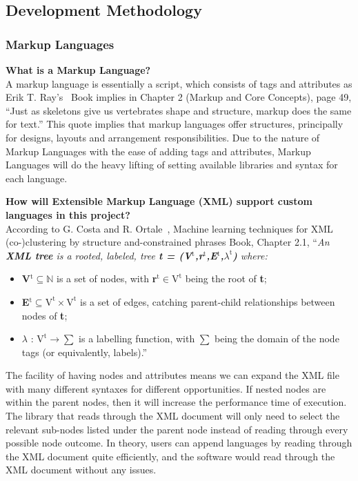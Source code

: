 \documentclass[conference]{IEEEtran}
\begin{document}
      \subsection{Development Methodology}
        \subsubsection{Markup Languages}
        \label{subsec:lr-markupLanguages}
          \textbf{What is a Markup Language?}\\
          A markup language is essentially a script, which consists of tags and attributes as Erik T. Ray's~\cite{ray_learning_nodate} Book implies in Chapter 2 (Markup and Core Concepts), page 49, ``Just as skeletons give us vertebrates shape and structure, markup does the same for text.'' This quote implies that markup languages offer structures, principally for designs, layouts and arrangement responsibilities. Due to the nature of Markup Languages with the ease of adding tags and attributes, Markup Languages will do the heavy lifting of setting available libraries and syntax for each language.

          \textbf{How will Extensible Markup Language (XML) support custom languages in this project?}\\
            According to G. Costa and R. Ortale~\cite{costa_machine_2018}, Machine learning techniques for XML (co-)clustering by structure and-constrained phrases Book, Chapter 2.1, ``\textit{An \textbf{XML tree} is a rooted, labeled, tree \textbf{t = (V$^{\text{t}}$,r$^{\text{t}}$,E$^{\text{t}}$,$\lambda^{\text{t}}$)} where:}
            \begin{itemize}
              \item \textbf{V$^{\text{t}} \subseteq \mathbb{N}$} is a set of nodes, with \textbf{r$^{\text{t}} \in \text{V}^{\text{t}}$} being the root of \textbf{t};
              \item \textbf{E$^{\text{t}} \subseteq \text{V}^{\text{t}} \times \text{V}^{\text{t}}$} is a set of edges, catching parent-child relationships between nodes of \textbf{t};
              \item \textbf{$\lambda \text{ : V}^{\text{t}} \rightarrow \sum $} is a labelling function, with $\sum$ being the domain of the node tags (or equivalently, labels).''
            \end{itemize}

            The facility of having nodes and attributes means we can expand the XML file with many different syntaxes for different opportunities. If nested nodes are within the parent nodes, then it will increase the performance time of execution. The library that reads through the XML document will only need to select the relevant sub-nodes listed under the parent node instead of reading through every possible node outcome. In theory, users can append languages by reading through the XML document quite efficiently, and the software would read through the XML document without any issues.
\end{document}

